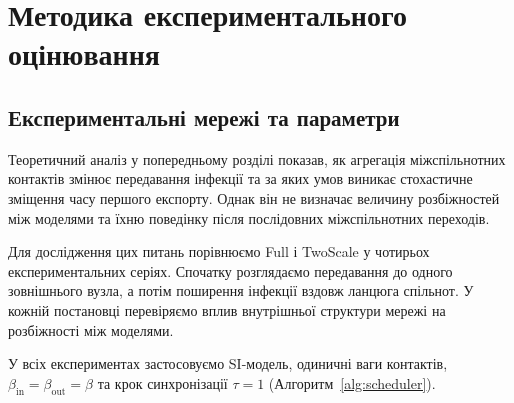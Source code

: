




\section{Методика експериментального оцінювання}
\label{sec:design}



\subsection{Експериментальні мережі та параметри}


Теоретичний аналіз у попередньому розділі показав,
як агрегація міжспільнотних контактів змінює
передавання інфекції та за яких умов виникає
стохастичне зміщення часу першого експорту.
Однак він не визначає величину розбіжностей
між моделями та їхню поведінку після
послідовних міжспільнотних переходів.

Для дослідження цих питань порівнюємо Full і TwoScale
у чотирьох експериментальних серіях.
Спочатку розглядаємо передавання до одного зовнішнього
вузла, а потім поширення інфекції вздовж ланцюга
спільнот. У кожній постановці перевіряємо вплив
внутрішньої структури мережі на розбіжності між моделями.

У всіх експериментах застосовуємо SI-модель,
одиничні ваги контактів,
$\beta_{\mathrm{in}}=\beta_{\mathrm{out}}=\beta$
та крок синхронізації $\tau=1$
(Алгоритм~\ref{alg:scheduler}).

